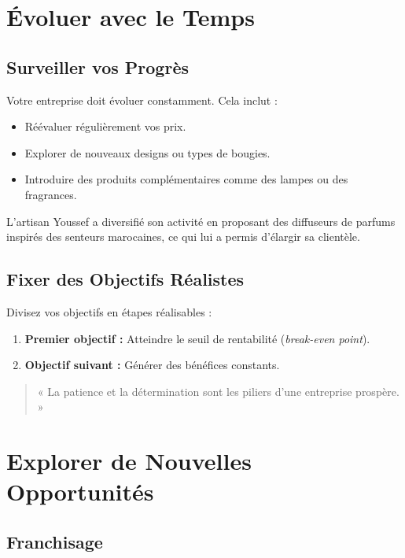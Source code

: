 \documentclass[11pt,fleqn,onecolumn,oneside]{book}
\begin{document}
\section{Évoluer avec le Temps}

\subsection*{Surveiller vos Progrès}

Votre entreprise doit évoluer constamment. Cela inclut :
\begin{itemize}
    \item Réévaluer régulièrement vos prix.
    \item Explorer de nouveaux designs ou types de bougies.
    \item Introduire des produits complémentaires comme des lampes ou des fragrances.
\end{itemize}

\begin{example}
L’artisan Youssef a diversifié son activité en proposant des diffuseurs de parfums inspirés des senteurs marocaines, ce qui lui a permis d’élargir sa clientèle.
\end{example}

\subsection*{Fixer des Objectifs Réalistes}

Divisez vos objectifs en étapes réalisables :
\begin{enumerate}
    \item \textbf{Premier objectif :} Atteindre le seuil de rentabilité (\textit{break-even point}).
    \item \textbf{Objectif suivant :} Générer des bénéfices constants.
\end{enumerate}

\begin{quote}
« La patience et la détermination sont les piliers d’une entreprise prospère. » 
\end{quote}

\section{Explorer de Nouvelles Opportunités}

\subsection*{Franchisage}
\end{document}
